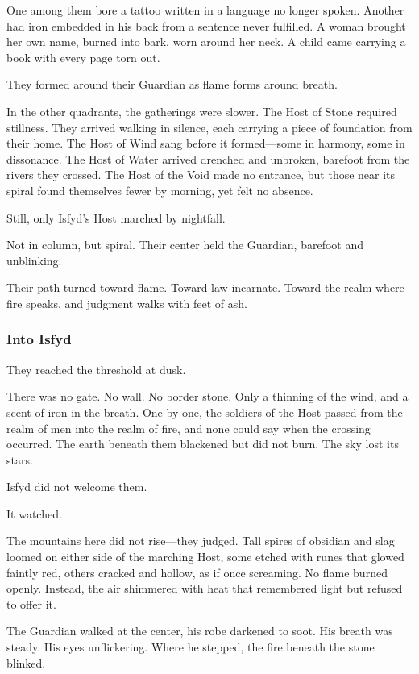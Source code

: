 \documentclass[12pt]{article}
\begin{document}
One among them bore a tattoo written in a language no longer spoken. Another had iron embedded in his back from a sentence never fulfilled. A woman brought her own name, burned into bark, worn around her neck. A child came carrying a book with every page torn out.

They formed around their Guardian as flame forms around breath.

In the other quadrants, the gatherings were slower. The Host of Stone required stillness. They arrived walking in silence, each carrying a piece of foundation from their home. The Host of Wind sang before it formed—some in harmony, some in dissonance. The Host of Water arrived drenched and unbroken, barefoot from the rivers they crossed. The Host of the Void made no entrance, but those near its spiral found themselves fewer by morning, yet felt no absence.

Still, only Isfyd’s Host marched by nightfall.

Not in column, but spiral. Their center held the Guardian, barefoot and unblinking.

Their path turned toward flame. Toward law incarnate. Toward the realm where fire speaks, and judgment walks with feet of ash.

\dotfill

\subsubsection*{Into Isfyd}

They reached the threshold at dusk.

There was no gate. No wall. No border stone. Only a thinning of the wind, and a scent of iron in the breath. One by one, the soldiers of the Host passed from the realm of men into the realm of fire, and none could say when the crossing occurred. The earth beneath them blackened but did not burn. The sky lost its stars.

Isfyd did not welcome them.

It watched.

The mountains here did not rise—they judged. Tall spires of obsidian and slag loomed on either side of the marching Host, some etched with runes that glowed faintly red, others cracked and hollow, as if once screaming. No flame burned openly. Instead, the air shimmered with heat that remembered light but refused to offer it.

The Guardian walked at the center, his robe darkened to soot. His breath was steady. His eyes unflickering. Where he stepped, the fire beneath the stone blinked.
\end{document}
